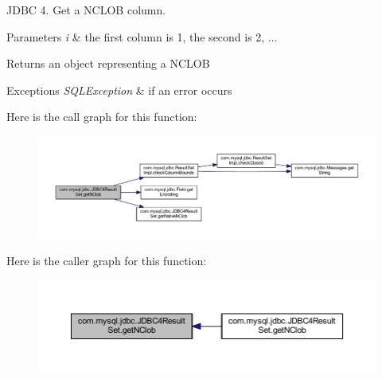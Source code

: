 J\+D\+BC 4. Get a N\+C\+L\+OB column.


\begin{DoxyParams}{Parameters}
{\em i} & the first column is 1, the second is 2, ...\\
\hline
\end{DoxyParams}
\begin{DoxyReturn}{Returns}
an object representing a N\+C\+L\+OB
\end{DoxyReturn}

\begin{DoxyExceptions}{Exceptions}
{\em S\+Q\+L\+Exception} & if an error occurs \\
\hline
\end{DoxyExceptions}
Here is the call graph for this function\+:
\nopagebreak
\begin{figure}[H]
\begin{center}
\leavevmode
\includegraphics[width=350pt]{classcom_1_1mysql_1_1jdbc_1_1_j_d_b_c4_result_set_af604405c61bde640ee0b00aba57b81e1_cgraph}
\end{center}
\end{figure}
Here is the caller graph for this function\+:
\nopagebreak
\begin{figure}[H]
\begin{center}
\leavevmode
\includegraphics[width=350pt]{classcom_1_1mysql_1_1jdbc_1_1_j_d_b_c4_result_set_af604405c61bde640ee0b00aba57b81e1_icgraph}
\end{center}
\end{figure}
\mbox{\label{classcom_1_1mysql_1_1jdbc_1_1_j_d_b_c4_result_set_ab31ba6018cd42a3af784126f0d17db83}} 
